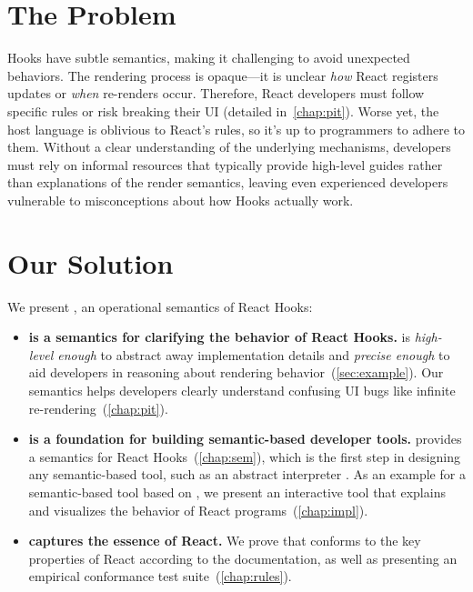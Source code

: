 \section{The Problem}
Hooks have subtle semantics, making it challenging to avoid unexpected behaviors.
The rendering process is opaque---it is unclear \emph{how} React registers updates or \emph{when} re-renders occur.
Therefore, React developers must follow specific rules or risk breaking their UI (detailed in~\cref{chap:pit}).
Worse yet, the host language is oblivious to React's rules, so it's up to programmers to adhere to them.
Without a clear understanding of the underlying mechanisms, developers must rely on informal resources that typically provide high-level guides rather than explanations of the render semantics, leaving even experienced developers vulnerable to misconceptions about how Hooks actually work.


\section{Our Solution}
We present \Rtrace, an operational semantics of React Hooks:
\begin{itemize}
  \item \textbf{\Rtrace{} is a semantics for clarifying the behavior of React Hooks.}
    \Rtrace{} is \emph{high-level enough} to abstract away implementation details and \emph{precise enough} to aid developers in reasoning about rendering behavior~(\cref{sec:example}).
    Our semantics helps developers clearly understand confusing UI bugs like infinite re-rendering~(\cref{chap:pit}).

  \item \textbf{\Rtrace{} is a foundation for building semantic-based developer tools.}
    \Rtrace{} provides a semantics for React Hooks~(\cref{chap:sem}), which is the first step in designing any semantic-based tool, such as an abstract interpreter \citep{CouCou77Abstract,RivYi20Introduction}.
    As an example for a semantic-based tool based on \Rtrace, we present an interactive tool that explains and visualizes the behavior of React programs~(\cref{chap:impl}).

  \item \textbf{\Rtrace{} captures the essence of React.}
    We prove that \Rtrace{} conforms to the key properties of React according to the documentation, as well as presenting an empirical conformance test suite~(\cref{chap:rules}).
\end{itemize}


